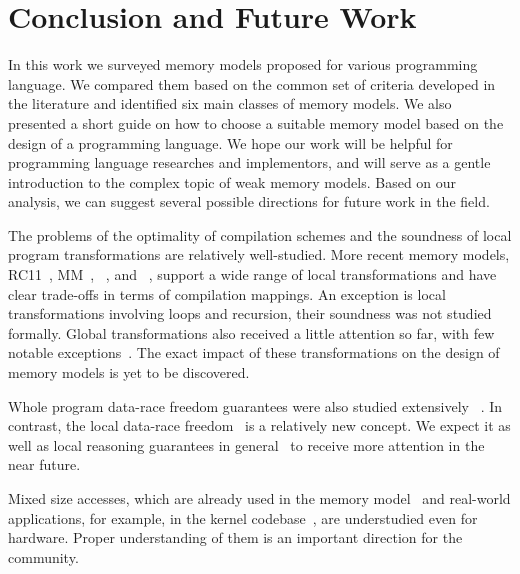 \section{Conclusion and Future Work}
\label{sec:conclusion}

In this work we surveyed memory models 
proposed for various programming language. 
We compared them based on the common set of criteria
developed in the literature and identified 
six main classes of memory models.
We also presented a short guide on how to 
choose a suitable memory model based on 
the design of a programming language. 
We hope our work will be helpful for 
programming language researches and implementors,
and will serve as a gentle introduction 
to the complex topic of weak memory models. 
Based on our analysis, we can suggest several
possible directions for future work in the field. 

The problems of the optimality of compilation schemes
and the soundness of local program transformations are relatively well-studied.
More recent memory models,
RC11~\cite{Lahav-al:PLDI17},
\OCaml MM~\cite{Dolan-al:PLDI18},
\Promising~\cite{Kang-al:POPL17,Lee-al:PLDI20},
and \Weakestmo~\cite{Chakraborty-Vafeiadis:POPL19},
support a wide range of local transformations and have clear 
trade-offs in terms of compilation mappings. 
An exception is local transformations involving loops and recursion, 
their soundness was not studied formally. 
Global transformations also received a little attention so far,
with few notable exceptions~\cite{PichonPharabod-Sewell:POPL16, Lee-al:PLDI20}.
The exact impact of these transformations on the design of 
memory models is yet to be discovered. 

Whole program data-race freedom guarantees were also studied extensively~%
\cite{Manson-al:POPL05, Batty-al:ESOP15, Lahav-al:PLDI17, Kang-al:POPL17}. 
In contrast, the local data-race freedom~\cite{Dolan-al:PLDI18} 
is a relatively new concept. 
We expect it as well as local reasoning guarantees 
in general~\cite{Dodds-al:ESOP18, Jagadeesan-al:OOPSLA2020, Cho-al:PLDI21} 
to receive more attention in the near future.  

Mixed size accesses\cite{Flur-al:POPL17},
which are already used in the \JS memory model~\cite{Watt-al:PLDI2020}
and real-world applications, for example, in the \Linux kernel codebase~\cite{Flur-al:POPL17},
are understudied even for hardware.
Proper understanding of them is an important direction for the community. 

